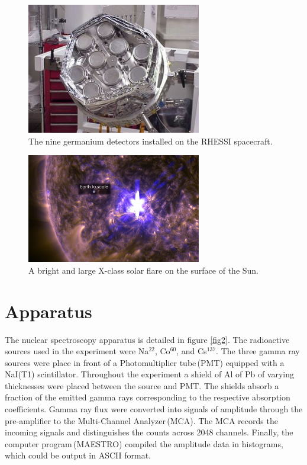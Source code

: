 \documentclass[aps,prl,twocolumn,superscriptaddress,nofootinbib]{revtex4-1}
\begin{document}
\begin{figure}[h!]

\centerline{\includegraphics[width=3in]{detets.jpg}}
\caption{ \small{The nine germanium detectors installed on the RHESSI spacecraft.\,\cite{3} \label{figrhessi}}}

\end{figure}



\begin{figure}[h!]
  \begin{center}
\centerline{\includegraphics[width=3in]{solarflare.jpg}}
\caption{ \small{A bright and large X-class solar flare on the surface of the Sun.\,\cite{4} \label{fig1}}}
  \end{center}
\end{figure}




\section{Apparatus}



The nuclear spectroscopy apparatus is detailed in figure \ref{fig2}. The radioactive sources used in the experiment were Na$^{22}$, Co$^{60}$, and Cs$^{137}$. The three gamma ray sources were place in front of a Photomultiplier tube\,(PMT) equipped with a NaI(T1) scintillator. Throughout the experiment a shield of Al of Pb of varying thicknesses were placed between the source and PMT. The shields absorb a fraction of the emitted gamma rays corresponding to the respective absorption coefficients. Gamma ray flux were converted into signals of amplitude through the pre-amplifier to the Multi-Channel Analyzer\,(MCA). The MCA records the incoming signals and distinguishes the counts across 2048 channels. Finally, the computer program\,(MAESTRO) compiled the amplitude data in histograms, which could be output in ASCII format.
\end{document}
